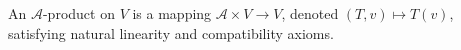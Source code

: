 An $\mathcal{A}$-product on $V$ is a mapping $\mathcal{A} \times V \to V$, denoted $(T, v) \mapsto T(v)$, satisfying natural linearity and compatibility axioms.
